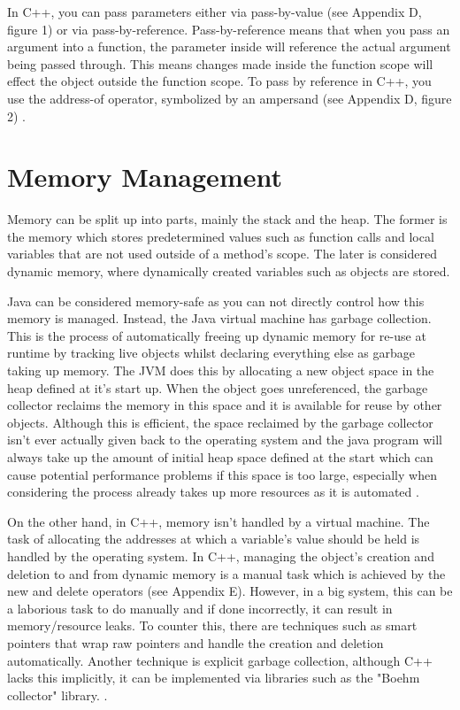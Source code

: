 \documentclass[]{report}
\begin{document}
In C++, you can pass parameters either via pass-by-value (see Appendix D, figure 1) or via pass-by-reference. Pass-by-reference means that when you pass an argument into a function, the parameter inside will reference the actual argument being passed through. This means changes made inside the function scope will effect the object outside the function scope. To pass by reference in C++, you use the address-of operator, symbolized by an ampersand (see Appendix D, figure 2) \cite{ParametersC++}.

\section{Memory Management}

Memory can be split up into parts, mainly the stack and the heap. The former is the memory which stores predetermined values such as function calls and local variables that are not used outside of a method's scope. The later is considered dynamic memory, where dynamically created variables such as objects are stored.

Java can be considered memory-safe as you can not directly control how this memory is managed. Instead, the Java virtual machine has garbage collection. This is the process of automatically freeing up dynamic memory for re-use at runtime by tracking live objects whilst declaring everything else as garbage taking up memory. The JVM does this by allocating a new object space in the heap defined at it's start up. When the object goes unreferenced, the garbage collector reclaims the memory in this space and it is available for reuse by other objects. Although this is efficient, the space reclaimed by the garbage collector isn't ever actually given back to the operating system and the java program will always take up the amount of initial heap space defined at the start which can cause potential performance problems if this space is too large, especially when considering the process already takes up more resources as it is automated \cite{MemoryJava}.

On the other hand, in C++, memory isn't handled by a virtual machine. The task of allocating the addresses at which a variable's value should be held is handled by the operating system. In C++, managing the object's creation and deletion to and from dynamic memory is a manual task which is achieved by the new and delete operators (see Appendix E). However, in a big system, this can be a laborious task to do manually and if done incorrectly, it can result in memory/resource leaks. To counter this, there are techniques such as smart pointers that wrap raw pointers and handle the creation and deletion automatically. \cite{Smart Pointers} Another technique is explicit garbage collection, although C++ lacks this implicitly, it can be implemented via libraries such as the "Boehm collector" library. \cite{Boehm}. 
\end{document}
